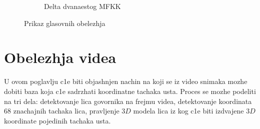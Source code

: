 \documentclass[a4paper, openany, oneside, 11pt]{book}
\begin{document}
\begin{figure}[!h]
\begin{subfigure}{0.475\textwidth}
            \caption{Delta dvanaestog MFKK}
            \label{fig:6b}
            \vspace{0pt}
        \end{subfigure}
        \caption{Prikaz glasovnih obelezhja}
        \label{fig:6}
\end{figure}

\chapter{Obelezhja videa}
U ovom poglavlju c1e biti objashnjen nachin na koji se iz video snimaka mozhe dobiti baza koja c1e sadrzhati koordinatne tachaka usta. Proces se mozhe podeliti na tri dela: detektovanje lica govornika na frejmu videa, detektovanje koordinata 68 znachajnih tachaka lica, pravljenje $3D$ modela lica iz kog c1e biti izdvajene $3D$ koordinate pojedinih tachaka usta.
\end{document}
